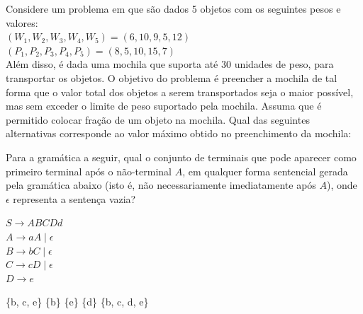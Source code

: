 \documentclass[12pt, addpoints]{exam}
\begin{document}
\begin{questions}
\question

Considere um problema em que são dados 5 objetos com os seguintes pesos e valores:\\

 $(W_1, W_2, W_3, W_4, W_5) = (6, 10, 9, 5, 12)$\\

 $(P_1, P_2, P_3, P_4, P_5) = (8, 5, 10, 15, 7)$\\

Além disso, é dada uma mochila que suporta até 30 unidades de peso, para transportar os objetos. O objetivo do problema é preencher a mochila de tal forma que o valor total dos objetos a serem transportados seja o maior possível, mas sem exceder o limite de peso suportado pela mochila. Assuma que é permitido colocar fração de um objeto na mochila. Qual das seguintes alternativas corresponde ao valor máximo obtido no preenchimento da mochila:
\begin{choices}
\end{choices}

\question

Para a gramática a seguir, qual o conjunto de terminais que pode aparecer como primeiro terminal após o não-terminal \( A \), em qualquer forma sentencial gerada pela gramática abaixo (isto é, não necessariamente imediatamente após \( A \)), onde \( \epsilon \) representa a sentença vazia?



$S \rightarrow ABCDd$\\

$A \rightarrow aA \mid \epsilon$\\

$B \rightarrow bC \mid \epsilon$\\

$C \rightarrow cD \mid \epsilon$\\

$D \rightarrow e$\\
\begin{choices}
\choice \{b, c, e\}
\choice \{b\}
\choice \{e\}
\choice \{d\}
\choice \{b, c, d, e\}
\end{choices}



    \end{questions}
    
\end{document}
